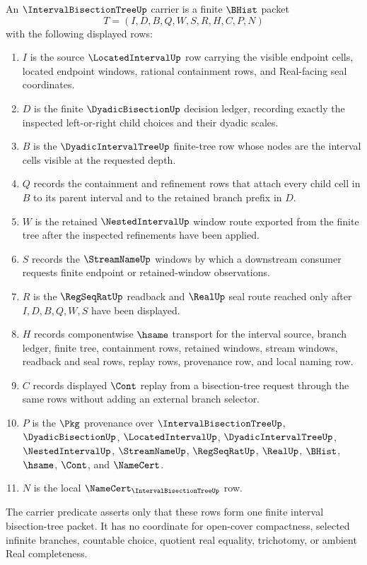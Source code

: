 \begin{definition}
\label{def:interval-bisection-tree-carrier}
An $\IntervalBisectionTreeUp$ carrier is a finite $\BHist$ packet
$$
T=(I,D,B,Q,W,S,R,H,C,P,N)
$$
with the following displayed rows:
\begin{enumerate}
\item $I$ is the source $\LocatedIntervalUp$ row carrying the visible endpoint cells, located endpoint windows, rational containment rows, and Real-facing seal coordinates.
\item $D$ is the finite $\DyadicBisectionUp$ decision ledger, recording exactly the inspected left-or-right child choices and their dyadic scales.
\item $B$ is the $\DyadicIntervalTreeUp$ finite-tree row whose nodes are the interval cells visible at the requested depth.
\item $Q$ records the containment and refinement rows that attach every child cell in $B$ to its parent interval and to the retained branch prefix in $D$.
\item $W$ is the retained $\NestedIntervalUp$ window route exported from the finite tree after the inspected refinements have been applied.
\item $S$ records the $\StreamNameUp$ windows by which a downstream consumer requests finite endpoint or retained-window observations.
\item $R$ is the $\RegSeqRatUp$ readback and $\RealUp$ seal route reached only after $I,D,B,Q,W,S$ have been displayed.
\item $H$ records componentwise $\hsame$ transport for the interval source, branch ledger, finite tree, containment rows, retained windows, stream windows, readback and seal rows, replay rows, provenance row, and local naming row.
\item $C$ records displayed $\Cont$ replay from a bisection-tree request through the same rows without adding an external branch selector.
\item $P$ is the $\Pkg$ provenance over $\IntervalBisectionTreeUp$, $\DyadicBisectionUp$, $\LocatedIntervalUp$, $\DyadicIntervalTreeUp$, $\NestedIntervalUp$, $\StreamNameUp$, $\RegSeqRatUp$, $\RealUp$, $\BHist$, $\hsame$, $\Cont$, and $\NameCert$.
\item $N$ is the local $\NameCert_{\IntervalBisectionTreeUp}$ row.
\end{enumerate}
The carrier predicate asserts only that these rows form one finite interval bisection-tree packet. It has no coordinate for open-cover compactness, selected infinite branches, countable choice, quotient real equality, trichotomy, or ambient Real completeness.
\end{definition}


